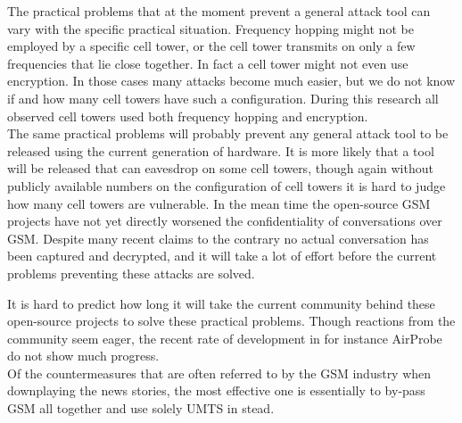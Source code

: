 \documentclass[a4paper,11pt]{llncs}
\begin{document}
The practical problems that at the moment prevent a general attack tool can vary with the specific practical situation. Frequency hopping might not be employed by a specific cell tower, or the cell tower transmits on only a few frequencies that lie close together. In fact a cell tower might not even use encryption. In those cases many attacks become much easier, but we do not know if and how many cell towers have such a configuration. During this research all observed cell towers used both frequency hopping and encryption.\\

The same practical problems will probably prevent any general attack tool to be released using the current generation of hardware. It is more likely that a tool will be released that can eavesdrop on some cell towers, though again without publicly available numbers on the configuration of cell towers it is hard to judge how many cell towers are vulnerable. In the mean time the open-source GSM projects have not yet directly worsened the confidentiality of conversations over GSM. Despite many recent claims to the contrary no actual conversation has been captured and decrypted, and it will take a lot of effort before the current problems preventing these attacks are solved.

It is hard to predict how long it will take the current community behind these open-source projects to solve these practical problems. Though reactions from the community seem eager, the recent rate of development in for instance AirProbe do not show much progress.\\

Of the countermeasures that are often referred to by the GSM industry when downplaying the news stories, the most effective one is essentially to by-pass GSM all together and use solely UMTS in stead.



\end{document}
